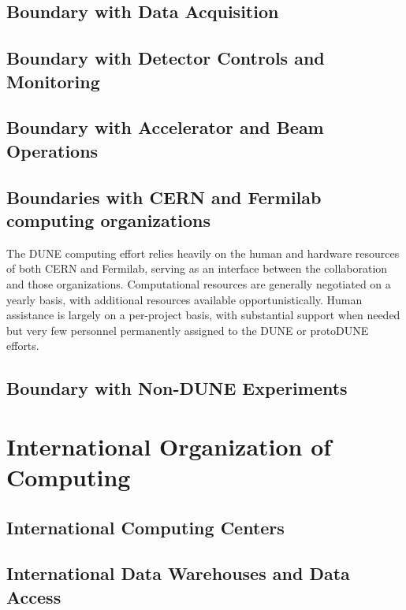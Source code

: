 \subsection{Boundary with Data Acquisition}
\subsection{Boundary with Detector Controls and Monitoring}
\subsection{Boundary with Accelerator and Beam Operations}
\subsection{Boundaries with CERN and Fermilab computing organizations}
The DUNE computing effort relies heavily on the human and hardware resources of both CERN and Fermilab, serving as an interface between the collaboration and those organizations.  Computational resources are generally negotiated on a yearly basis, with additional resources available opportunistically. Human assistance is largely on a per-project  basis, with substantial support when needed but very few personnel permanently assigned to the DUNE or protoDUNE efforts. 
\subsection{Boundary with Non-DUNE Experiments}

\section{International Organization of Computing}
\label{sw:ov-intl-org}

\subsection{International Computing Centers}
\subsection{International Data Warehouses and Data Access}
